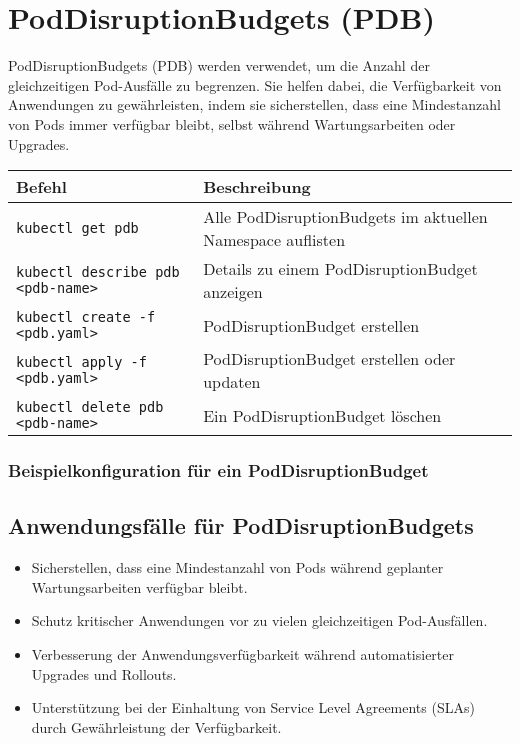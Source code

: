 \section{PodDisruptionBudgets (PDB)}
PodDisruptionBudgets (PDB) werden verwendet, um die Anzahl der gleichzeitigen Pod-Ausfälle zu begrenzen. Sie helfen dabei, die Verfügbarkeit von Anwendungen zu gewährleisten, indem sie sicherstellen, dass eine Mindestanzahl von Pods immer verfügbar bleibt, selbst während Wartungsarbeiten oder Upgrades.\\

\noindent
\begin{tabular}{
|p{}|p{}|}
\hline
\textbf{Befehl} & \textbf{Beschreibung} \\
\hline
\texttt{kubectl get pdb} & Alle PodDisruptionBudgets im aktuellen Namespace auflisten \\
\texttt{kubectl describe pdb <pdb-name>} & Details zu einem PodDisruptionBudget anzeigen \\
\texttt{kubectl create -f <pdb.yaml>} & PodDisruptionBudget erstellen\\
\texttt{kubectl apply -f <pdb.yaml>} & PodDisruptionBudget erstellen oder updaten\\
\texttt{kubectl delete pdb <pdb-name>} & Ein PodDisruptionBudget löschen \\
\hline
\end{tabular}

\subsubsection{Beispielkonfiguration für ein PodDisruptionBudget}


\newpage

\subsection{Anwendungsfälle für PodDisruptionBudgets}
\begin{itemize}
    \item Sicherstellen, dass eine Mindestanzahl von Pods während geplanter Wartungsarbeiten verfügbar bleibt.
    \item Schutz kritischer Anwendungen vor zu vielen gleichzeitigen Pod-Ausfällen.
    \item Verbesserung der Anwendungsverfügbarkeit während automatisierter Upgrades und Rollouts.
    \item Unterstützung bei der Einhaltung von Service Level Agreements (SLAs) durch Gewährleistung der Verfügbarkeit.
\end{itemize}

